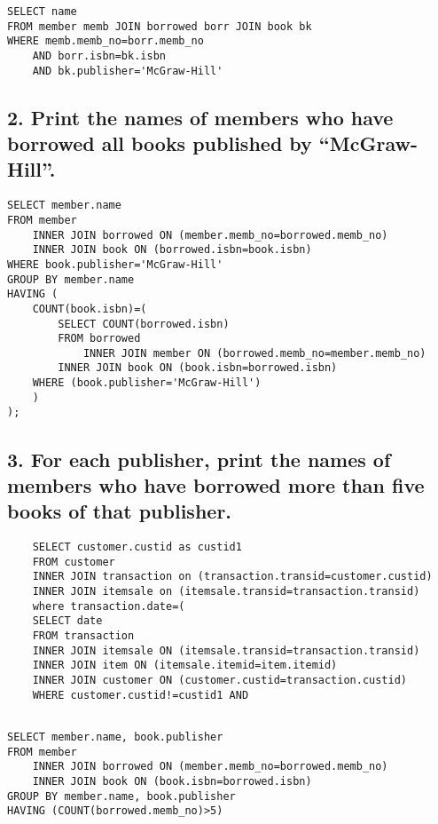 \documentclass[12pt]{article}
\begin{document}
\begin{lstlisting}
SELECT name
FROM member memb JOIN borrowed borr JOIN book bk 
WHERE memb.memb_no=borr.memb_no 
	AND borr.isbn=bk.isbn 
	AND bk.publisher='McGraw-Hill'
\end{lstlisting}

\subsection*{2. Print the names of members who have borrowed all books published by “McGraw-Hill”.}
%

\begin{lstlisting}
SELECT member.name
FROM member
	INNER JOIN borrowed ON (member.memb_no=borrowed.memb_no)
	INNER JOIN book ON (borrowed.isbn=book.isbn)
WHERE book.publisher='McGraw-Hill'
GROUP BY member.name
HAVING (
	COUNT(book.isbn)=(
		SELECT COUNT(borrowed.isbn)
		FROM borrowed
			INNER JOIN member ON (borrowed.memb_no=member.memb_no)
		INNER JOIN book ON (book.isbn=borrowed.isbn)
	WHERE (book.publisher='McGraw-Hill')
	)
);
\end{lstlisting}

\subsection*{3. For each publisher, print the names of members who have borrowed more than five books of that publisher. }

\begin{lstlisting}
	SELECT customer.custid as custid1
	FROM customer
	INNER JOIN transaction on (transaction.transid=customer.custid)
	INNER JOIN itemsale on (itemsale.transid=transaction.transid)
	where transaction.date=(
	SELECT date
	FROM transaction
	INNER JOIN itemsale ON (itemsale.transid=transaction.transid)
	INNER JOIN item ON (itemsale.itemid=item.itemid)
	INNER JOIN customer ON (customer.custid=transaction.custid)
	WHERE customer.custid!=custid1 AND 
	
\end{lstlisting}
\begin{lstlisting}
SELECT member.name, book.publisher
FROM member
	INNER JOIN borrowed ON (member.memb_no=borrowed.memb_no)
	INNER JOIN book ON (book.isbn=borrowed.isbn)
GROUP BY member.name, book.publisher
HAVING (COUNT(borrowed.memb_no)>5)
\end{lstlisting}
\end{document}
